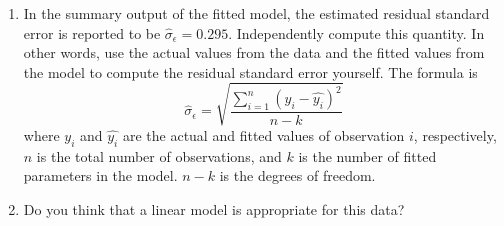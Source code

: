 \documentclass[12pt]{book}
\begin{document}
\begin{enumerate}
\begin{enumerate}
  \item In the summary output of the fitted model, the estimated residual
    standard error is reported to be
    $\hat{\sigma}_{\epsilon}=0.295$. Independently compute this quantity. In
    other words, use the actual values from the data and the fitted
    values from the model to compute the residual standard error
    yourself.  The formula is
    \[ \hat{\sigma}_{\epsilon} = \sqrt{ \frac{\sum_{i=1}^n \left(y_i - \hat{y_i}\right)^2}{n-k}} \]
    where $y_i$ and $\hat{y_i}$ are the actual and fitted values of observation
    $i$, respectively, $n$ is the total number of observations, and $k$ is the
    number of fitted parameters in the model. $n-k$ is the degrees of freedom.

  \item Do you think that a linear model is appropriate for this data?
  \end{enumerate}
    
\end{enumerate}

%
\backmatter
%
\nocite{Anderson:2015pnas} %

\end{document}
